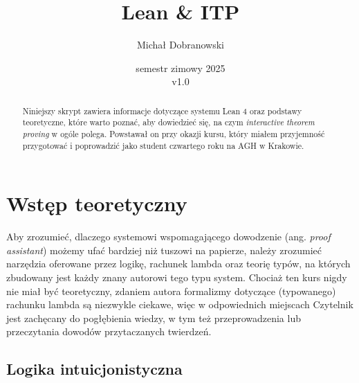 \documentclass[polish,pretty,bibliography=totocnumbered]{angav}
\title{Lean \& ITP}
\author{Michał Dobranowski}
\date{semestr zimowy 2025 \\ v1.0}
\begin{document}
\maketitle
\begin{abstract}
    \noindent Niniejszy skrypt zawiera informacje dotyczące systemu Lean 4 oraz podstawy teoretyczne, które warto poznać, aby dowiedzieć się, na czym \textit{interactive theorem proving} w ogóle polega. Powstawał on przy okazji kursu, który miałem przyjemność przygotować i poprowadzić jako student czwartego roku na AGH w Krakowie.
\end{abstract}
\vspace*{\fill}
{\footnotesize\doclicenseThis}
\newpage

\tableofcontents
\newpage

\section{Wstęp teoretyczny}

Aby zrozumieć, dlaczego systemowi wspomagającego dowodzenie (ang. \textit{proof assistant}) możemy ufać bardziej niż tuszowi na papierze, należy zrozumieć narzędzia oferowane przez logikę, rachunek lambda oraz teorię typów, na których zbudowany jest każdy znany autorowi tego typu system.
Chociaż ten kurs nigdy nie miał być teoretyczny, zdaniem autora formalizmy dotyczące (typowanego) rachunku lambda są niezwykle ciekawe, więc w odpowiednich miejscach Czytelnik jest zachęcany do pogłębienia wiedzy, w tym też przeprowadzenia lub przeczytania dowodów przytaczanych twierdzeń.

\subsection{Logika intuicjonistyczna}
\end{document}
